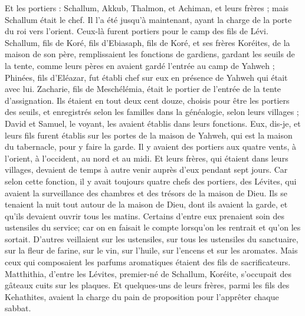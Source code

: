 \begin{multicols}{2}
Et les portiers : Schallum, Akkub, Thalmon, et Achiman, et leurs frères ; mais Schallum était le chef.
Il l'a été jusqu'à maintenant, ayant la charge de la porte du roi vers l’orient. Ceux-là furent portiers pour le camp des fils de Lévi.
Schallum, fils de Koré, fils d'Ebiasaph, fils de Koré, et ses frères Koréites, de la maison de son père, remplissaient les fonctions de gardiens, gardant les seuils de la tente, comme leurs pères en avaient gardé l'entrée au camp de Yahweh ;
Phinées, fils d'Eléazar, fut établi chef sur eux en présence de Yahweh qui était avec lui.
Zacharie, fils de Meschélémia, était le portier de l'entrée de la tente d'assignation.
Ils étaient en tout deux cent douze, choisis pour être les portiers des seuils, et enregistrés selon les familles dans la généalogie, selon leurs villages ; David et Samuel, le voyant, les avaient établis dans leurs fonctions.
Eux, dis-je, et leurs fils furent établis sur les portes de la maison de Yahweh, qui est la maison du tabernacle, pour y faire la garde.
Il y avaient des portiers aux quatre vents, à l'orient, à l'occident, au nord et au midi.
Et leurs frères, qui étaient dans leurs villages, devaient de temps à autre venir auprès d’eux pendant sept jours.
Car selon cette fonction, il y avait toujours quatre chefs des portiers, des Lévites, qui avaient la surveillance des chambres et des trésors de la maison de Dieu.
Ils se tenaient la nuit tout autour de la maison de Dieu, dont ils avaient la garde, et qu’ils devaient ouvrir tous les matins.
Certains d’entre eux prenaient soin des ustensiles du service; car on en faisait le compte lorsqu'on les rentrait et qu'on les sortait.
D’autres veillaient sur les ustensiles, sur tous les ustensiles du sanctuaire, sur la fleur de farine, sur le vin, sur l'huile, sur l'encens et sur les aromates.
Mais ceux qui composaient les parfums aromatiques étaient des fils de sacrificateurs.
Matthithia, d'entre les Lévites, premier-né de Schallum, Koréite, s’occupait des gâteaux cuits sur les plaques.
Et quelques-uns de leurs frères, parmi les fils des Kehathites, avaient la charge du pain de proposition  pour l'apprêter chaque sabbat.

\end{multicols}
